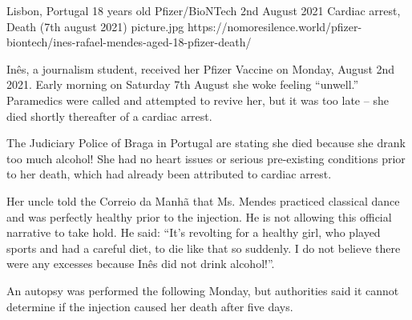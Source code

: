 {Lisbon, Portugal}
{18 years old}
{Pfizer/BioNTech}
{2nd August 2021}
{Cardiac arrest, Death (7th august 2021)}
{picture.jpg}
{https://nomoresilence.world/pfizer-biontech/ines-rafael-mendes-aged-18-pfizer-death/}
{

Inês, a journalism student, received her Pfizer Vaccine on Monday, August 2nd
2021. Early morning on Saturday 7th August she woke feeling “unwell.” Paramedics
were called and attempted to revive her, but it was too late – she died shortly
thereafter of a cardiac arrest.

The Judiciary Police of Braga in Portugal are stating she died because she drank
too much alcohol! She had no heart issues or serious pre-existing conditions
prior to her death, which had already been attributed to cardiac arrest.

Her uncle told the Correio da Manhã that Ms. Mendes practiced classical dance
and was perfectly healthy prior to the injection. He is not allowing this
official narrative to take hold. He said: “It’s revolting for a healthy girl,
who played sports and had a careful diet, to die like that so suddenly. I do not
believe there were any excesses because Inês did not drink alcohol!”.

An autopsy was performed the following Monday, but authorities said it cannot
determine if the injection caused her death after five days.

}
